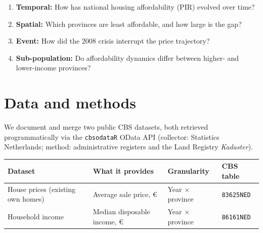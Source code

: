\documentclass[
]{article}
\newcounter{none} %
\providecommand{\tightlist}{%
  \setlength{\itemsep}{0pt}\setlength{\parskip}{0pt}}
\begin{document}
\begin{enumerate}
\def\labelenumi{\arabic{enumi}.}
\tightlist
\item
  \textbf{Temporal:} How has national housing affordability (PIR)
  evolved over time?
\item
  \textbf{Spatial:} Which provinces are least affordable, and how large
  is the gap?
\item
  \textbf{Event:} How did the 2008 crisis interrupt the price
  trajectory?
\item
  \textbf{Sub-population:} Do affordability dynamics differ between
  higher- and lower-income provinces?
\end{enumerate}

\section{Data and methods}\label{data-and-methods}

We document and merge two public CBS datasets, both retrieved
programmatically via the \texttt{cbsodataR} OData API (collector:
Statistics Netherlands; method: administrative registers and the Land
Registry \emph{Kadaster}).

{\def\LTcaptype{none} %
\begin{longtable}[]{@{}
  >{\raggedright\arraybackslash}p{}
  >{\raggedright\arraybackslash}p{}
  >{\raggedright\arraybackslash}p{}
  >{\raggedright\arraybackslash}p{}@{}}
\toprule\noalign{}
\begin{minipage}[b]{\linewidth}\raggedright
Dataset
\end{minipage} & \begin{minipage}[b]{\linewidth}\raggedright
What it provides
\end{minipage} & \begin{minipage}[b]{\linewidth}\raggedright
Granularity
\end{minipage} & \begin{minipage}[b]{\linewidth}\raggedright
CBS table
\end{minipage} \\
\midrule\noalign{}
\endhead
\bottomrule\noalign{}
\endlastfoot
House prices (existing own homes) & Average sale price, € & Year ×
province & \texttt{83625NED} \\
Household income & Median disposable income, € & Year × province &
\texttt{86161NED} \\
\end{longtable}
}
\end{document}
